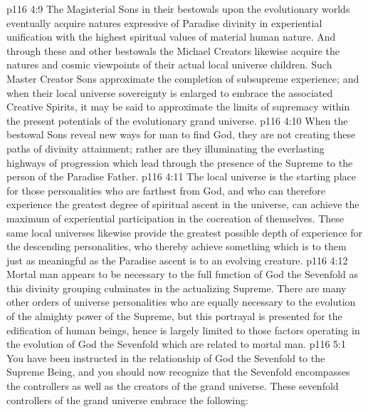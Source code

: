 \vs p116 4:9 The Magisterial Sons in their bestowals upon the evolutionary worlds eventually acquire natures expressive of Paradise divinity in experiential unification with the highest spiritual values of material human nature. And through these and other bestowals the Michael Creators likewise acquire the natures and cosmic viewpoints of their actual local universe children. Such Master Creator Sons approximate the completion of subsupreme experience; and when their local universe sovereignty is enlarged to embrace the associated Creative Spirits, it may be said to approximate the limits of supremacy within the present potentials of the evolutionary grand universe.
\vs p116 4:10 When the bestowal Sons reveal new ways for man to find God, they are not creating these paths of divinity attainment; rather are they illuminating the everlasting highways of progression which lead through the presence of the Supreme to the person of the Paradise Father.
\vs p116 4:11 The local universe is the starting place for those personalities who are farthest from God, and who can therefore experience the greatest degree of spiritual ascent in the universe, can achieve the maximum of experiential participation in the cocreation of themselves. These same local universes likewise provide the greatest possible depth of experience for the descending personalities, who thereby achieve something which is to them just as meaningful as the Paradise ascent is to an evolving creature.
\vs p116 4:12 \pc Mortal man appears to be necessary to the full function of God the Sevenfold as this divinity grouping culminates in the actualizing Supreme. There are many other orders of universe personalities who are equally necessary to the evolution of the almighty power of the Supreme, but this portrayal is presented for the edification of human beings, hence is largely limited to those factors operating in the evolution of God the Sevenfold which are related to mortal man.
\vs p116 5:1 You have been instructed in the relationship of God the Sevenfold to the Supreme Being, and you should now recognize that the Sevenfold encompasses the controllers as well as the creators of the grand universe. These sevenfold controllers of the grand universe embrace the following:
